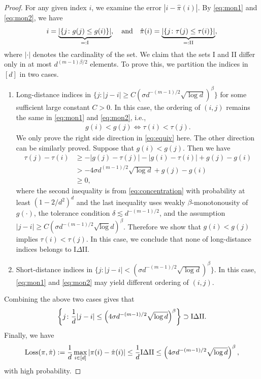 \documentclass[12pt]{article}
\theoremstyle{definition}
\begin{document}
\begin{proof}
For any given index $i$, we examine the error $|i-\hat\pi(i)|$. By \eqref{eq:mon1} and \eqref{eq:mon2}, we have
\begin{align}
    i = \underbrace{|\{j\colon g(j)\leq g(i)\}|}_{=:\textup{I}},\quad\text{and}\quad \hat\pi(i) = \underbrace{|\{j\colon \tau(j)\leq \tau(i)\}|}_{=:\textup{II}},
\end{align}
where $|\cdot|$ denotes the cardinality of the set. We claim that the sets I and II differ only in at most $d^{(m-1)\beta/2}$ elements. To prove this, we partition the indices in $[d]$ in two cases.
\begin{enumerate}
    \item Long-distance indices in $\{j\colon|j-i|\geq 
C \left(\sigma d^{-(m-1)/2}\sqrt{\log d}\right)^{\beta} \}$ for some sufficient large constant $C>0$. In this case, the ordering of $(i,j)$ remains the same in \eqref{eq:mon1} and \eqref{eq:mon2}, i.e.,
    \begin{align}\label{eq:equiv}
        g(i) < g(j) \Longleftrightarrow \tau(i) < \tau(j).
    \end{align}
    We only prove the right side direction in  \eqref{eq:equiv} here. The other direction can be similarly proved.
    Suppose that $g(i) < g(j)$. Then we have
    \begin{align}
        \tau(j)-\tau(i) &\geq -|g(j)-\tau(j)|-|g(i)-\tau(i)| + g(j)-g(i)
       \\& > -4\sigma d^{(m-1)/2}\sqrt{\log d} + g(j)-g(i)
       \\&\geq 0,
    \end{align}
    where the second inequality is from \eqref{eq:concentration} with probability at least $(1-2/d^2)^d$ and the last inequality uses weakly $\beta$-monotonousity of $g(\cdot)$, the tolerance condition $\delta\lesssim  d^{-(m-1)/2}$, and the assumption
    $|j-i|\geq C\left(\sigma d^{-(m-1)/2}\sqrt{\log} d\right)^{\beta}$. Therefore we show that $g(i)<g(j)$ implies $\tau(i)<\tau(j).$
    In this case, we conclude that none of long-distance indices belongs to I$\Delta$II.
    \item Short-distance indices in $\{j\colon|j-i|< \left(\sigma d^{-(m-1)/2}\sqrt{\log d}\right)^{\beta} \}$. In this case, \eqref{eq:mon1} and \eqref{eq:mon2} may yield different ordering of $(i,j).$
\end{enumerate}
Combining the above two cases gives that 
\begin{align}
   \left \{j\colon\frac{1}{d}|j-i|\leq \left(4\sigma d^{-(m-1)/2}\sqrt{\log d}\right)^{\beta}\right \}\supset \textup{I}\Delta\textup{II}.
\end{align}
Finally, we have
\begin{align}
    \textup{Loss}(\pi,\hat\pi) := \frac{1}{d}\max_{i\in[d]}|\pi(i)-\hat\pi(i)|\leq\frac{1}{d}\textup{I}\Delta\textup{II}\leq \left(4\sigma d^{-(m-1)/2}\sqrt{\log d}\right)^{\beta},
\end{align}
with high probability.
\end{proof}
\end{document}
